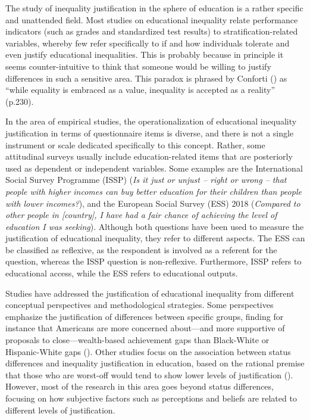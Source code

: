 \documentclass[
  12pt,
  a4paper,
]{article}
\begin{document}
The study of inequality justification in the sphere of education is a rather specific and unattended field. Most studies on educational inequality relate performance indicators (such as grades and standardized test results) to stratification-related variables, whereby few refer specifically to if and how individuals tolerate and even justify educational inequalities. This is probably because in principle it seems counter-intuitive to think that someone would be willing to justify differences in such a sensitive area. This paradox is phrased by Conforti () as ``while equality is embraced as a value, inequality is accepted as a reality'' (p.230).

In the area of empirical studies, the operationalization of educational inequality justification in terms of questionnaire items is diverse, and there is not a single instrument or scale dedicated specifically to this concept. Rather, some attitudinal surveys usually include education-related items that are posteriorly used as dependent or independent variables. Some examples are the International Social Survey Programme (ISSP) (\emph{Is it just or unjust -- right or wrong -- that people with higher incomes can buy better education for their children than people with lower incomes?}), and the European Social Survey (ESS) 2018 (\emph{Compared to other people in {[}country{]}, I have had a fair chance of achieving the level of education I was seeking}). Although both questions have been used to measure the justification of educational inequality, they refer to different aspects. The ESS can be classified as reflexive, as the respondent is involved as a referent for the question, whereas the ISSP question is non-reflexive. Furthermore, ISSP refers to educational access, while the ESS refers to educational outputs.

Studies have addressed the justification of educational inequality from different conceptual perspectives and methodological strategies. Some perspectives emphasize the justification of differences between specific groups, finding for instance that Americans are more concerned about---and more supportive of proposals to close---wealth-based achievement gaps than Black-White or Hispanic-White gaps (). Other studies focus on the association between status differences and inequality justification in education, based on the rational premise that those who are worst-off would tend to show lower levels of justification (). However, most of the research in this area goes beyond status differences, focusing on how subjective factors such as perceptions and beliefs are related to different levels of justification.
\end{document}
